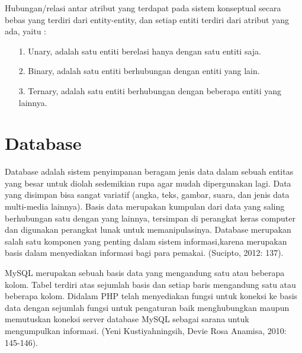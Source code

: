 \documentclass{jtetiproposalskripsi}
\begin{document}
Hubungan/relasi antar atribut yang terdapat pada sistem konseptual secara bebas yang terdiri dari entity-entity, dan setiap entiti terdiri dari atribut yang ada, yaitu :
\begin{itemize}
\item[1.]Unary, adalah satu entiti berelasi  hanya dengan satu entiti saja.
\item[2.]Binary, adalah satu entiti berhubungan dengan entiti yang lain.
\item[3.]Ternary, adalah satu entiti berhubungan dengan beberapa entiti yang lainnya. 
\end{itemize}
	 
\section{Database}

Database adalah sistem penyimpanan beragam jenis data dalam sebuah entitas yang besar untuk diolah sedemikian rupa agar mudah dipergunakan lagi. Data yang disimpan bisa sangat variatif (angka, teks, gambar, suara, dan jenis data multi-media lainnya). Basis data merupakan kumpulan dari data yang saling berhubungan satu dengan yang lainnya, tersimpan di perangkat keras computer dan digunakan perangkat lunak untuk memanipulasinya. Database merupakan salah satu komponen yang penting dalam sistem informasi,karena merupakan basis dalam menyediakan informasi bagi para pemakai. (Sucipto, 2012: 137).

MySQL merupakan sebuah basis data yang mengandung satu atau beberapa kolom. Tabel terdiri atas sejumlah basis dan setiap baris mengandung satu atau beberapa kolom. Didalam PHP telah menyediakan fungsi untuk koneksi ke basis data dengan sejumlah fungsi untuk pengaturan baik menghubungkan maupun memutuskan koneksi server database MySQL sebagai sarana untuk mengumpulkan informasi. (Yeni Kustiyahningsih, Devie Rosa Anamisa, 2010: 145-146).
\end{document}
